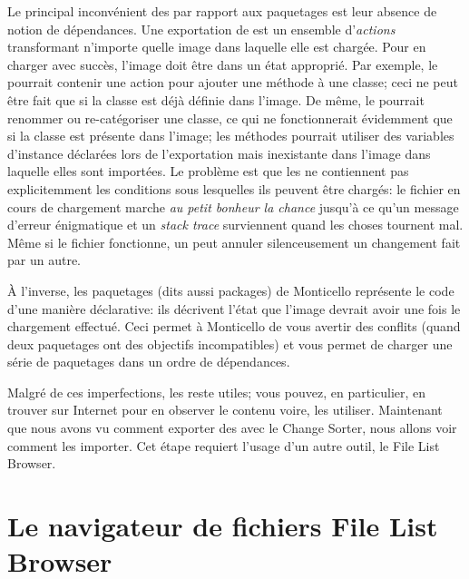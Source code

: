 \documentclass[a4paper,10pt,twoside]{book}
\begin{document}
Le principal inconv\'enient des \changesets par rapport aux paquetages 
est leur absence de notion de d\'ependances.
Une exportation de \changeset est un ensemble d'\emph{actions} transformant n'importe quelle
image dans laquelle elle est charg\'ee. Pour en charger avec succ\`es, l'image doit \^etre
dans un \'etat appropri\'e.
Par exemple, le \changeset pourrait contenir une action pour ajouter une m\'ethode \`a une
classe; ceci ne peut \^etre fait que si la classe est d\'ej\`a d\'efinie dans l'image.
De m\^eme, le \changeset pourrait renommer ou re-cat\'egoriser une classe, ce qui ne 
fonctionnerait \'evidemment que si la classe est pr\'esente dans l'image; les m\'ethodes
pourrait utiliser des variables d'instance d\'eclar\'ees lors de l'exportation mais
inexistante dans l'image dans laquelle elles sont import\'ees.
Le probl\`eme est que les \changesets ne contiennent pas explicitemment les conditions 
sous lesquelles ils peuvent \^etre charg\'es:
le fichier en cours de chargement marche \emph{au petit bonheur la chance} jusqu'\`a
ce qu'un message d'erreur \'enigmatique et un \emph{stack trace} surviennent
quand les choses tournent mal.
M\^eme si le fichier fonctionne, un \changeset peut annuler silenceusement 
un changement fait par un autre.

\`A l'inverse, les paquetages (dits aussi packages) de Monticello repr\'esente le code d'une mani\`ere 
d\'eclarative: ils d\'ecrivent l'\'etat que l'image devrait avoir une fois le chargement
effectu\'e.
Ceci permet \`a Monticello de vous avertir des conflits (quand deux paquetages ont des
objectifs incompatibles)
et vous permet de charger une s\'erie de paquetages dans un ordre de d\'ependances.

Malgr\'e de ces imperfections, les \changesets reste utiles; vous pouvez, en particulier, en trouver sur Internet pour en observer le contenu voire, les utiliser.
Maintenant que nous avons vu comment exporter des \changesets avec le Change Sorter,
nous allons voir comment les importer.
Cet \'etape requiert l'usage d'un autre outil, le File List Browser.

\section{Le navigateur de fichiers File List Browser}
\end{document}

